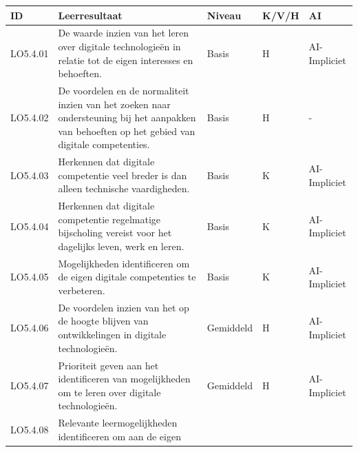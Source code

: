 \documentclass[
  dutch,
  letterpaper,
  DIV=11,
  numbers=noendperiod]{scrartcl}
\begin{document}
\begin{longtable}[]{@{}
  >{\centering\arraybackslash}p{}
  >{\centering\arraybackslash}p{}
  >{\centering\arraybackslash}p{}
  >{\centering\arraybackslash}p{}
  >{\centering\arraybackslash}p{}@{}}
\toprule\noalign{}
\begin{minipage}[b]{\linewidth}\centering
ID
\end{minipage} & \begin{minipage}[b]{\linewidth}\centering
Leerresultaat
\end{minipage} & \begin{minipage}[b]{\linewidth}\centering
Niveau
\end{minipage} & \begin{minipage}[b]{\linewidth}\centering
K/V/H
\end{minipage} & \begin{minipage}[b]{\linewidth}\centering
AI
\end{minipage} \\
\midrule\noalign{}
\endhead
\bottomrule\noalign{}
\endlastfoot
LO5.4.01 & De waarde inzien van het leren over digitale technologieën in
relatie tot de eigen interesses en behoeften. & Basis & H &
AI-Impliciet \\
LO5.4.02 & De voordelen en de normaliteit inzien van het zoeken naar
ondersteuning bij het aanpakken van behoeften op het gebied van digitale
competenties. & Basis & H & - \\
LO5.4.03 & Herkennen dat digitale competentie veel breder is dan alleen
technische vaardigheden. & Basis & K & AI-Impliciet \\
LO5.4.04 & Herkennen dat digitale competentie regelmatige bijscholing
vereist voor het dagelijks leven, werk en leren. & Basis & K &
AI-Impliciet \\
LO5.4.05 & Mogelijkheden identificeren om de eigen digitale competenties
te verbeteren. & Basis & K & AI-Impliciet \\
LO5.4.06 & De voordelen inzien van het op de hoogte blijven van
ontwikkelingen in digitale technologieën. & Gemiddeld & H &
AI-Impliciet \\
LO5.4.07 & Prioriteit geven aan het identificeren van mogelijkheden om
te leren over digitale technologieën. & Gemiddeld & H & AI-Impliciet \\
LO5.4.08 & Relevante leermogelijkheden identificeren om aan de eigen

\end{longtable}
\end{document}
